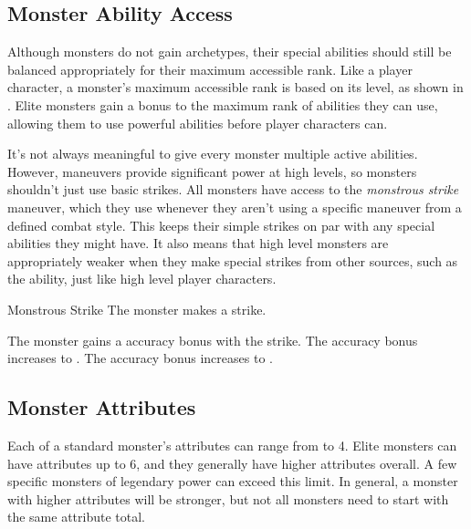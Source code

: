         \subsection{Monster Ability Access}\label{Monster Ability Access}
            Although monsters do not gain archetypes, their special abilities should still be balanced appropriately for their maximum accessible rank.
            Like a player character, a monster's maximum accessible rank is based on its level, as shown in .
            Elite monsters gain a  bonus to the maximum rank of abilities they can use, allowing them to use powerful abilities before player characters can.

            It's not always meaningful to give every monster multiple active abilities.
            However, maneuvers provide significant power at high levels, so monsters shouldn't just use basic strikes.
            All monsters have access to the \textit{monstrous strike} maneuver, which they use whenever they aren't using a specific maneuver from a defined combat style.
            This keeps their simple strikes on par with any special abilities they might have.
            It also means that high level monsters are appropriately weaker when they make special strikes from other sources, such as the  ability, just like high level player characters.
            \begin{activeability}{Monstrous Strike}
                \rankline
                The monster makes a strike.

                \rankline
                 The monster gains a  accuracy bonus with the strike.
                 The accuracy bonus increases to .
                 The accuracy bonus increases to .
            \end{activeability}

    \subsection{Monster Attributes}\label{Monster Attributes}
        Each of a standard monster's attributes can range from  to 4.
        Elite monsters can have attributes up to 6, and they generally have higher attributes overall.
        A few specific monsters of legendary power can exceed this limit.
        In general, a monster with higher attributes will be stronger, but not all monsters need to start with the same attribute total.

